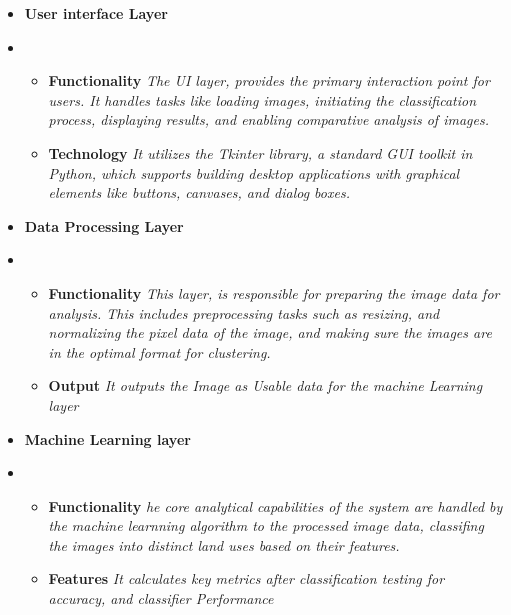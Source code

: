 \begin{itemize}
    \item \textbf{User interface Layer}
    \item  \begin{itemize}
               \item \textbf{Functionality}
               \textit{The UI layer, provides the primary interaction point for users.
               It handles tasks like loading images, initiating the classification process, displaying results, and enabling
               comparative analysis of images.}
               \item \textbf{Technology}
               \textit{It utilizes the Tkinter library, a standard GUI toolkit in Python, which supports building desktop applications
               with graphical elements like buttons, canvases, and dialog boxes.}
            \end{itemize}
    \item \textbf{Data Processing Layer}
    \item  \begin{itemize}
               \item \textbf{Functionality}
               \textit{This layer, is responsible for preparing the image data for analysis.
               This includes preprocessing tasks such as resizing, and normalizing the pixel data of the image,
                   and making sure the images are in the optimal format for clustering.}
               \item \textbf{Output}
               \textit{It outputs the Image as Usable data for the machine Learning layer}
           \end{itemize}
    \item \textbf{Machine Learning layer}
    \item   \begin{itemize}
               \item \textbf{Functionality}
               \textit{he core analytical capabilities of the system are handled by the machine learnning algorithm to the processed image data,
                   classifing  the images into distinct land uses based on their features.}
               \item \textbf{Features}
               \textit{It calculates key metrics after classification testing for accuracy, and classifier Performance}
            \end{itemize}
\end{itemize}


